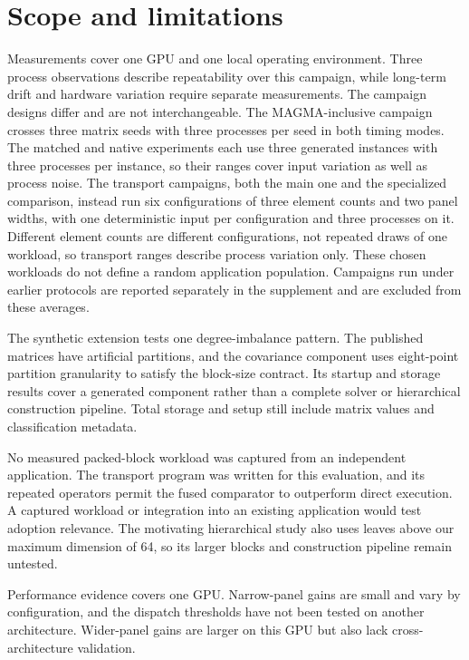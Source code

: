 \documentclass[10pt]{article}
\begin{document}
\section{Scope and limitations}\label{sec:limitations}
Measurements cover one GPU and one local operating environment. Three
process observations describe repeatability over this campaign, while
long-term drift and hardware variation require separate measurements.
The campaign designs differ and are not interchangeable. The MAGMA-inclusive
campaign crosses three matrix seeds with three processes per seed in both
timing modes. The matched and native experiments each use three generated
instances with three processes per instance, so their ranges cover input
variation as well as process noise. The transport campaigns, both the main one
and the specialized comparison, instead run six configurations of three
element counts and two panel widths, with one deterministic input per
configuration and three processes on it. Different element counts are
different configurations, not repeated draws of one workload, so transport
ranges describe process variation only.
These chosen workloads do not define a random application population.
Campaigns run under earlier protocols are reported separately in the
supplement and are excluded from these averages.

The synthetic extension tests one degree-imbalance pattern. The published
matrices have artificial partitions, and the covariance component uses
eight-point partition granularity to satisfy the block-size contract.
Its startup and storage results cover a generated component rather than a
complete solver or hierarchical construction pipeline. Total storage and
setup still include matrix values and classification metadata.

No measured packed-block workload was captured from an independent
application. The transport program was written for this evaluation, and its
repeated operators permit the fused comparator to outperform direct execution.
A captured workload or integration into an existing application would test
adoption relevance. The motivating hierarchical study also uses leaves above
our maximum dimension of 64, so its larger blocks and construction pipeline
remain untested.

Performance evidence covers one GPU. Narrow-panel gains are small and vary
by configuration, and the dispatch thresholds have not been tested on another
architecture. Wider-panel gains are larger on this GPU but also lack
cross-architecture validation.
\end{document}
